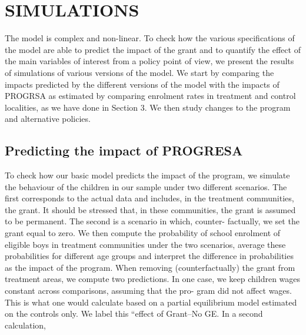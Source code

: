 \documentclass{handoutForSolutions}
\begin{document}
\newpage

\section{SIMULATIONS}
The model is complex and non-linear. To check how the various specifications of the model are able to predict the impact of the grant and to quantify the effect of the main variables of interest from a policy point of view, we present the results of simulations of various versions of the model. We start by comparing the impacts predicted by the different versions of the model with the impacts of PROGRSA as estimated by comparing enrolment rates in treatment and control localities, as we have done in Section 3. We then study changes to the program and alternative policies.

\subsection{Predicting the impact of PROGRESA}
To check how our basic model predicts the impact of the program, we simulate the behaviour of the children in our sample under two different scenarios. The first corresponds to the actual data and includes, in the treatment communities, the grant. It should be stressed that, in these communities, the grant is assumed to be permanent. The second is a scenario in which, counter- factually, we set the grant equal to zero. We then compute the probability of school enrolment of eligible boys in treatment communities under the two scenarios, average these probabilities for different age groups and interpret the difference in probabilities as the impact of the program. When removing (counterfactually) the grant from treatment areas, we compute two predictions. In one case, we keep children wages constant across comparisons, assuming that the pro- gram did not affect wages. This is what one would calculate based on a partial equilibrium model estimated on the controls only. We label this ``effect of Grant--No GE. In a second calculation,
\end{document}
